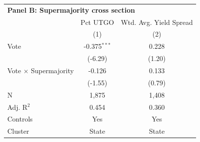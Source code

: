 \begingroup
\centering
\begin{tabular*}{\textwidth}{@{\extracolsep{\fill}}lcc}
\multicolumn{3}{l}{\textbf{Panel B: Supermajority cross section}}\\

\addlinespace
   \toprule
                                & Pct UTGO       & Wtd. Avg. Yield Spread\\  
                                & (1)            & (2)\\  
   \midrule 
   Vote                         & -0.375$^{***}$ & 0.228\\   
                                & (-6.29)       & (1.20)\\   
   Vote $\times$ Supermajority  & -0.126         & 0.133\\   
                                & (-1.55)       & (0.79)\\   
   \hline
   N                 & 1,875          & 1,408\\  
   Adj. R$^2$               & 0.454          & 0.360\\  
   Controls                   & Yes            & Yes\\
   Cluster              & State & State\\  
   \bottomrule
\end{tabular*}
\par\endgroup
